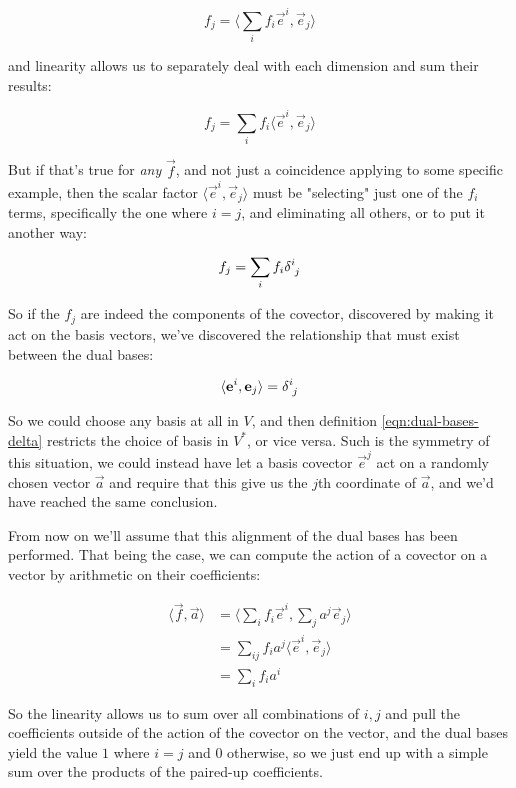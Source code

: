 $$
f_j = \langle \sum_i f_i \vec{e}^i , \vec{e}_j\rangle
$$

and linearity allows us to separately deal with each dimension and sum their results:

$$
f_j = \sum_i f_i \langle \vec{e}^i , \vec{e}_j\rangle
$$

But if that's true for \textit{any} $\vec{f}$, and not just a coincidence applying to some specific example, then the scalar factor $\langle \vec{e}^i , \vec{e}_j\rangle$ must be "selecting" just one of the $f_i$ terms, specifically the one where $i = j$, and eliminating all others, or to put it another way:

$$
f_j = \sum_i f_i \delta \indices{^i_j}
$$

So if the $f_j$ are indeed the components of the covector, discovered by making it act on the basis vectors, we've discovered the relationship that must exist between the dual bases:

\begin{equation}
    \langle \vec{e}^i,\vec{e}_j\rangle = \delta\indices{^i_j}
    \label{eqn:dual-bases-delta}
\end{equation}

So we could choose any basis at all in $V$, and then definition \eqref{eqn:dual-bases-delta} restricts the choice of basis in $V^*$, or vice versa. Such is the symmetry of this situation, we could instead have let a basis covector $\vec{e}^j$ act on a randomly chosen vector $\vec{a}$ and require that this give us the $j$th coordinate of $\vec{a}$, and we'd have reached the same conclusion.

From now on we'll assume that this alignment of the dual bases has been performed. That being the case, we can compute the action of a covector on a vector by arithmetic on their coefficients:

\begin{equation}
    \begin{split}
        \langle \vec{f},\vec{a}\rangle 
        &= \langle \sum_i f_i \vec{e}^i , \sum_j a^j \vec{e}_j \rangle \\
        &= \sum_{ij} f_i a^j \langle\vec{e}^i,\vec{e}_j\rangle \\
        &= \sum_{i} f_i a^i
    \end{split}
\end{equation}

So the linearity allows us to sum over all combinations of $i, j$ and pull the coefficients outside of the action of the covector on the vector, and the dual bases yield the value $1$ where $i = j$ and $0$ otherwise, so we just end up with a simple sum over the products of the paired-up coefficients.

